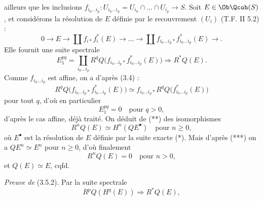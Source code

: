 ailleurs que les inclusions $f_{i_0\ldots i_p}:U_{i_0\ldots i_p}=U_{i_0}\cap\ldots\cap U_{i_p}\longrightarrow S$. Soit $E\in\Ob\Qcoh(S)$, et considérons la résolution de $E$ définie par le recouvrement $(U_i)$ (T.F. II 5.2) :
\begin{equation}\tag{*}
 0\longrightarrow E\longrightarrow \coprod f_{i*}f_i^*(E)\longrightarrow\ldots\longrightarrow
 \coprod f_{i_0\ldots i_p*}f_{i_0\ldots i_p}^*(E)\longrightarrow .
\end{equation}
Elle fournit une suite spectrale
\begin{equation}\tag{**}
 E_1^{pq}=\coprod_{i_0\ldots i_p}R^qQ\bigl(f_{i_0\ldots i_p*}f_{i_0\ldots i_p}^*(E)\bigr)
 \Longrightarrow R^{*}Q(E).
\end{equation}
Comme $f_{i_0\ldots i_p}$ est affine, on a d'après (3.4) :
\begin{equation}\tag{***}
 R^qQ\bigl(f_{i_0\ldots i_p*}f_{i_0\ldots i_p}^*(E)\bigr)
 \simeq f_{i_0\ldots i_p*}R^qQ\bigl(f_{i_0\ldots i_p}^*(E)\bigr)
\end{equation}
pour tout $q$, d'où en particulier
\[
 E_1^{pq}=0\quad\text{pour }q>0,
\]
d'après le cas affine, déjà traité. On déduit de (**) des isomorphismes
\[
 R^nQ(E)\simeq H^n(QE^\bullet)\quad\text{pour }n\geq0,
\]
où $E^\bullet$ est la résolution de $E$ définie par la suite exacte (*). Mais d'après (***) on a $QE^n\simeq E^n$ pour $n\geq0$, d'où finalement
\[
 R^nQ(E)=0\quad\text{pour }n>0,
\]
et $Q(E)\simeq E$, cqfd.

\emph{Preuve de} (3.5.2). Par la suite spectrale
\[
 R^pQ(H^q(E))\Longrightarrow R^{*}Q(E),
\]
